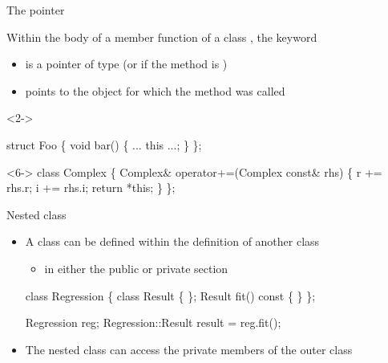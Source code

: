 \begin{frame}[fragile]{The  pointer}

  Within the body of a member function of a class , the keyword
  \begin{itemize}
  \item is a pointer of type  (or  if the method is
    )
  \item points to the object for which the method was called
  \end{itemize}

\begin{codeblock}<2->{
struct Foo \{
  void bar() \{
    ... this ...;
  \}
\};

}\end{codeblock}

    \begin{codeblock}<6->{
class Complex \{
  \ddd
  Complex\alert{&} operator+=(Complex const& rhs) \{
    r += rhs.r; i += rhs.i;
    return \alert{*this};
  \}
\};}\end{codeblock}

\end{frame}

\begin{frame}[fragile]{Nested class}
  \begin{itemize}

  \item A class can be defined within the definition of another class
    \begin{itemize}
    \item in either the public or private section
    \end{itemize}

    \begin{codeblock}
class Regression \{
  \ddd
  \alert{class Result \{ \ddd \};}
  Result fit() const \{ \ddd \}
\};

Regression reg;
\ddd
Regression::Result result = reg.fit();\end{codeblock}

  \item<2-> The nested class can access the private members of the outer class
  \end{itemize}

\end{frame}

